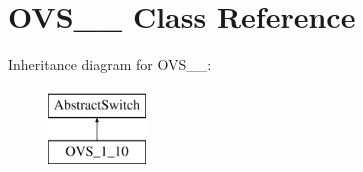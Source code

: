 \hypertarget{classOVS__1__10}{\section{\-O\-V\-S\-\_\-\_ \-Class \-Reference}
\label{classOVS__1__10}
}
\-Inheritance diagram for \-O\-V\-S\-\_\-\_\-:\begin{figure}[H]
\begin{center}
\leavevmode
\includegraphics[height=2.000000cm]{classOVS__1__10}
\end{center}
\end{figure}
